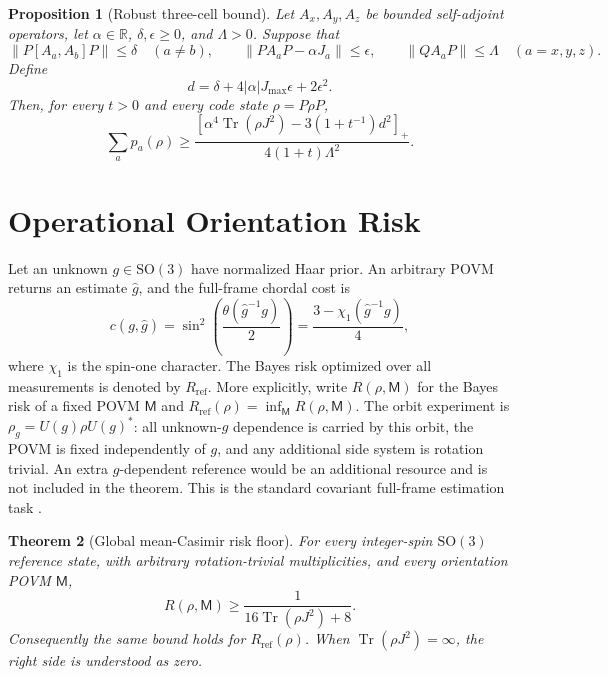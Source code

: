 \documentclass[11pt]{article}
\newtheorem{theorem}{Theorem}
\newtheorem{proposition}[theorem]{Proposition}
\theoremstyle{remark}
\newcommand{\1}{\mathbf 1}
\newcommand{\Tr}{\operatorname{Tr}}
\newcommand{\SO}{\mathrm{SO}(3)}
\newcommand{\Rref}{R_{\mathrm{ref}}}
\newcommand{\positive}[1]{\left[#1\right]_{+}}
\begin{document}
\begin{proposition}[Robust three-cell bound]
\label{prop:robust}
Let $A_x,A_y,A_z$ be bounded self-adjoint operators, let
$\alpha\in\mathbb R$, $\delta,\epsilon\geq0$, and $\Lambda>0$. Suppose that
\[
  \lVert P[A_a,A_b]P\rVert\leq\delta\quad(a\neq b),
  \qquad
  \lVert P A_aP-\alpha J_a\rVert\leq\epsilon,
  \qquad
  \lVert Q A_aP\rVert\leq\Lambda\quad(a=x,y,z).
\]
Define
\begin{equation}
  d=\delta+4|\alpha|J_{\max}\epsilon+2\epsilon^2.
  \label{eq:defect-d}
\end{equation}
Then, for every $t>0$ and every code state $\rho=P\rho P$,
\begin{equation}
  \sum_a p_a(\rho)
  \geq
  \frac{
    \positive{\alpha^4\Tr(\rho J^2)-3(1+t^{-1})d^2}
  }{4(1+t)\Lambda^2}.
  \label{eq:robust-bound}
\end{equation}
\end{proposition}

\section{Operational Orientation Risk}
\label{sec:risk}

Let an unknown $g\in\SO$ have normalized Haar prior. An arbitrary POVM
returns an estimate $\hat g$, and the full-frame chordal cost is
\begin{equation}
  c(g,\hat g)
  =\sin^2\!\left(\frac{\theta(\hat g^{-1}g)}{2}\right)
  =\frac{3-\chi_1(\hat g^{-1}g)}{4},
  \label{eq:chordal-cost}
\end{equation}
where $\chi_1$ is the spin-one character. The Bayes risk optimized over all
measurements is denoted by $\Rref$. More explicitly, write
$R(\rho,\mathsf M)$ for the Bayes risk of a fixed POVM $\mathsf M$ and
$\Rref(\rho)=\inf_{\mathsf M}R(\rho,\mathsf M)$. The orbit experiment is
$\rho_g=U(g)\rho U(g)^*$: all unknown-$g$ dependence is carried by this orbit,
the POVM is fixed independently of $g$, and any additional side system is
rotation trivial. An extra $g$-dependent reference would be an additional
resource and is not included in the theorem.
This is the standard covariant full-frame estimation task
\cite{holevo1982,peres2001,bagan2001}.

\begin{theorem}[Global mean-Casimir risk floor]
\label{thm:risk-floor}
For every integer-spin $\SO$ reference state, with arbitrary
rotation-trivial multiplicities, and every orientation POVM $\mathsf M$,
\begin{equation}
  R(\rho,\mathsf M)\geq\frac{1}{16\Tr(\rho J^2)+8}.
  \label{eq:risk-floor}
\end{equation}
Consequently the same bound holds for $\Rref(\rho)$.
When $\Tr(\rho J^2)=\infty$, the right side is understood as zero.
\end{theorem}
\end{document}
